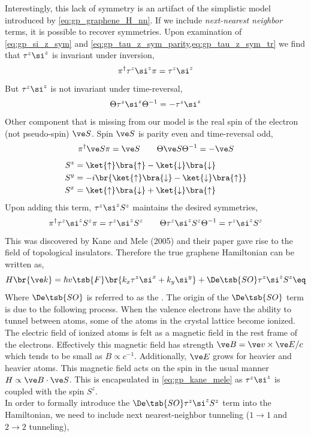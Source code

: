 \documentclass{article}
\newcommand{\uu}{\uparrow}
\newcommand{\dd}{\downarrow}
\begin{document}
Interestingly, this lack of symmetry is an artifact of the simplistic model introduced by \cref{eq:gp_graphene_H_nn}. If we include \textit{next-nearest neighbor} terms, it is possible to recover symmetries. Upon examination of \cref{eq:gp_si_z_sym} and \cref{eq:gp_tau_z_sym_parity,eq:gp_tau_z_sym_tr} we find that $\tau^{z} \si^{z}$ is invariant under inversion,
\[ \pi^{\dagger} \tau^{z} \si^{z} \pi = \tau^{z} \si^{z} \]
But $\tau^{z} \si^{z}$ is not invariant under time-reversal,
\[ \Theta \tau^{z} \si^{z} \Theta^{-1} = -\tau^{z} \si^{z} \]
Other component that is missing from our model is the real spin of the electron (not pseudo-spin) $\ve S$. Spin $\ve S$ is parity even and time-reversal odd,
\[ \pi^{\dagger} \ve S \pi = \ve S \qquad \Theta \ve S \Theta^{-1} = - \ve S \]
\begin{align*}
    S^{z} &= \ket{\uu} \bra{\uu} - \ket{\dd}\bra{\dd} \\
    S^{y} &= -i\br{\ket{\uu} \bra{\dd} - \ket{\dd}\bra{\uu}} \\
    S^{x} &= \ket{\uu} \bra{\dd} + \ket{\dd}\bra{\uu}
\end{align*}
Upon adding this term, $\tau^{z} \si^{z} S^{z}$ maintains the desired symmetries,
\[ \pi^{\dagger} \tau^{z} \si^{z} S^{z} \pi = \tau^{z} \si^{z} S^{z} \qquad \Theta \tau^{z} \si^{z} S^{z} \Theta^{-1} = \tau^{z} \si^{z} S^{z} \]
This was discovered by Kane and Mele (2005) and their paper gave rise to the field of topological insulators. Therefore the true graphene Hamiltonian can be written as,
\[ H\br{\ve k} =\hbar v\tsb{F} \br{k_x \tau^{z} \si^x + k_y \si^{y}} + \De\tsb{SO} \tau^{z} \si^{z} S^{z} \eq \label{eq:gp_kane_mele}\]
Where $\De\tsb{SO}$ is referred to as the . The origin of the $\De\tsb{SO}$ term is due to the following process. When the valence electrons have the ability to tunnel between atoms, some of the atoms in the crystal lattice become ionized. The electric field of ionized atoms is felt as a magnetic field in the rest frame of the electrons. Effectively this magnetic field has strength $\ve B = \ve v \times \ve E / c$ which tends to be small as $B \propto c^{-1}$. Additionally, $\ve E$ grows for heavier and heavier atoms. This magnetic field acts on the spin in the usual manner $H \propto \ve B \cdot \ve S$. This is encapsulated in \cref{eq:gp_kane_mele} as $\tau^{z} \si^{z}$ is coupled with the spin $S^{z}$. \\

In order to formally introduce the $\De\tsb{SO} \tau^{z} \si^{z} S^{z}$ term into the Hamiltonian, we need to include next nearest-neighbor tunneling ($1 \to 1$ and $2 \to 2$ tunneling),
\end{document}
